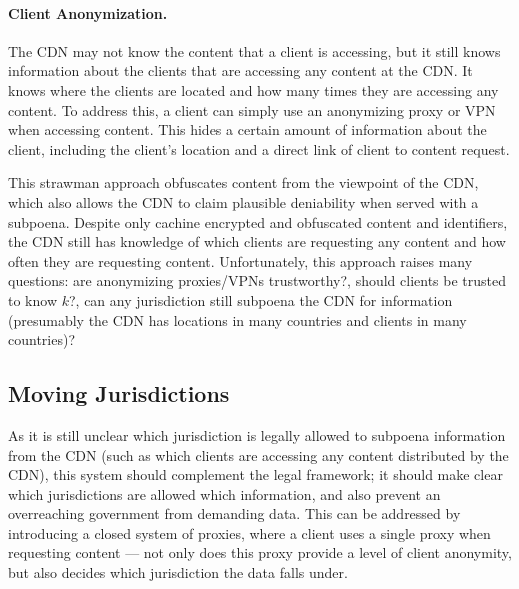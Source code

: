 \paragraph{Client Anonymization.}  The CDN may not know the content that a client is accessing, but it 
still knows information about the clients that are accessing any content at the CDN.  It knows 
where the clients are located and how many times they are accessing any content.  To address this, 
a client can simply use an anonymizing proxy or VPN when accessing content.  This hides a certain 
amount of information about the client, including the client's location and a direct link of 
client to content request.

This strawman approach obfuscates content from the viewpoint of the CDN, which also allows the CDN 
to claim plausible deniability when served with a subpoena.  Despite only cachine encrypted and obfuscated 
content and identifiers, the CDN still has knowledge of which clients are requesting any content and how often 
they are requesting content.  Unfortunately, this approach raises 
many questions: are anonymizing proxies/VPNs trustworthy?, should clients be trusted to know $k$?, 
can any jurisdiction still subpoena the CDN for information (presumably the CDN has locations in many 
countries and clients in many countries)?


\subsection{Moving Jurisdictions}
As it is still unclear which jurisdiction is legally allowed to subpoena information from the CDN (such as which 
clients are accessing any content distributed by the CDN), this 
system should complement the legal framework; it should make clear which jurisdictions are allowed 
which information, and also prevent an overreaching government from demanding data.  This 
can be addressed by introducing a closed system of proxies, where a client uses a single proxy when requesting 
content --- not only does this proxy provide a level of client anonymity, but also decides which jurisdiction 
the data falls under.  

